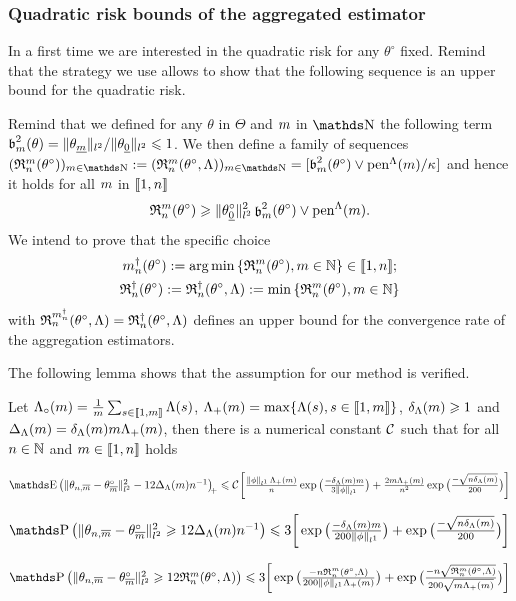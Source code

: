  \subsubsection{Quadratic risk bounds of the aggregated estimator}\label{AK:RB:OR}
 In a first time we are interested in the quadratic risk for any $\theta^{\circ}$ fixed.
Remind that the strategy we use allows to show that the following sequence is an upper bound for the quadratic risk.
\begin{de*}
Remind that we defined for any $\theta$ in $\Theta$ and $\Di$ in $\N$ the following term $\b_{m}^{2}(\theta) = \Vert \theta_{\underline{m}} \Vert_{l^{2}}/\Vert \theta_{\underline{0}} \Vert_{l^{2}} \leq 1$.
We then define a family of sequences $(\daRa{\Di}{(\xdf)})_{\Di \in \N} := (\daRa{\Di}{(\xdf,\Lambda)})_{\Di \in \N} = [\b_{m}^{2}(\theta^{\circ}) \vee \penSv/\cpen]$ and hence it holds for all $\Di$ in $\nset{1,\ssY}$
    \begin{equation}
      [\Vnormlp{\xdf_{\underline{0}}}^2+\cpen]\daRa{\Di}{(\xdf)}\geq\Vnormlp{\xdf_{\underline{0}}}^2\bias^2(\xdf)\vee\penSv.
      \end{equation}
We intend to prove that the specific choice
\begin{multline*}
\aDi{\ssY}(\xdf):=\argmin\Nset[\Di\in\Nz]{\daRa{\Di}{(\xdf)}}\in\nset{1,\ssY}; \\
\naRa{(\xdf)}:=\naRa{(\xdf,\Lambda)}:=\min\Nset[\Di\in\Nz]{\daRa{\Di}{(\xdf)}}
\end{multline*}
with $\daRa{\aDi{\ssY}}{(\xdf,\Lambda)}=\naRa{(\xdf,\Lambda)}$ defines an upper bound for the convergence rate of the aggregation estimators.
\assEnd
\end{de*}
 
The following lemma shows that the assumption for our method is verified.
\begin{lm}\label{re:conc}
  Let $\oiSv=\tfrac{1}{\Di}\sum_{s\in\nset{1,\Di}}\iSv[s]$,
  $\miSv= \max\{\iSv[s],s\in\nset{1,\Di}\}$, $\cmSv\geq1$ and
  $\DipenSv=\cmSv\Di \miSv$, then there is a numerical constant
  $\cst{}$ such that for all $\ssY\in\Nz$ and
  $\Di\in\nset{1,\ssY}$ holds
  \begin{resListeN}[]
  \item\label{re:conc:i}
    $\E \vectp{\Vnormlp{\txdfPr-\xdfPr}^2 - 12\DipenSv\ssY^{-1}}\\
    \leq 
    \cst{} \bigg[\tfrac{\Vnormlp[1]{\fydf}\,\miSv}{\ssY}\exp\big(\tfrac{-\cmSv\Di}{3\Vnormlp[1]{\fydf}}\big)+\tfrac{2\Di\miSv}{n^2}\exp\big(\tfrac{-\sqrt{n\cmSv}}{200}\big) \bigg]$
  \item\label{re:conc:ii}
    $\P\big(\Vnormlp{\txdfPr-\xdfPr}^2 \geq 12\DipenSv\ssY^{-1}\big)\leq 
    3 \bigg[\exp\big(\tfrac{-\cmSv\Di}{200\Vnormlp[1]{\fydf}}\big)
    +\exp\big(\tfrac{-\sqrt{\ssY\cmSv}}{200}\big)\bigg]$
  \item\label{re:conc:iii}
    $\P\big(\Vnormlp{\txdfPr-\xdfPr}^2 \geq 12\daRa{\Di}{(\xdf,\Lambda)}\big)\leq 
    3 \bigg[\exp\big(\tfrac{-\ssY\daRa{\Di}{(\xdf,\Lambda)}}{200\Vnormlp[1]{\fydf}\miSv}\big)
    +\exp\big(\tfrac{-\ssY\sqrt{\daRa{\Di}{(\xdf,\Lambda)}}}{200\sqrt{\Di\miSv}}\big)\bigg]$
  \end{resListeN}
\end{lm}

